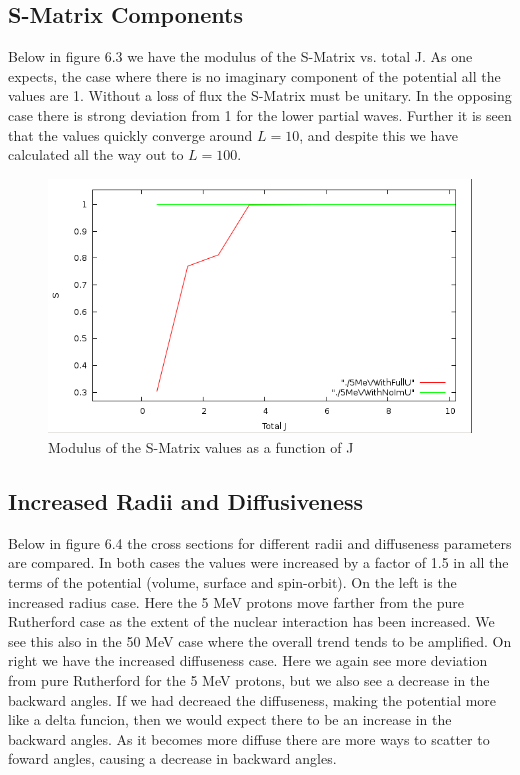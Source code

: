 \documentclass[paper=a4, fontsize=11pt]{scrartcl} %
\numberwithin{equation}{section} %
\numberwithin{figure}{section} %
\numberwithin{table}{section} %
\begin{document}
\subsection{S-Matrix Components}
Below in figure 6.3 we have the modulus of the S-Matrix vs. total J.  As one expects, the case where there is no imaginary component of the potential all the values are 1.  Without a loss of flux the S-Matrix must be unitary.  In the opposing case there is strong deviation from 1 for the lower partial waves.  Further it is seen that the values quickly converge around $L=10$, and despite this we have calculated all the way out to $L=100$.
\begin{figure}[hbt]
        \centering
	\includegraphics[width=.4\textwidth]{SMatrixV_J.PNG}
 \caption{Modulus of the S-Matrix values as a function of J}	
\end{figure}


\subsection{Increased Radii and Diffusiveness}

Below in figure 6.4 the cross sections for different radii and diffuseness parameters are compared.  In both cases the values were increased by a factor of 1.5 in all the terms of the potential (volume, surface and spin-orbit).  On the left is the increased radius case.  Here the 5 MeV protons move farther from the pure Rutherford case as the extent of the nuclear interaction has been increased.  We see this also in the 50 MeV case where the overall trend tends to be amplified.  On right we have the increased diffuseness case.  Here we again see more deviation from pure Rutherford for the 5 MeV protons, but we also see a decrease in the backward angles.  If we had decreaed the diffuseness, making the potential more like a delta funcion, then we would expect there to be an increase in the backward angles.  As it becomes more diffuse there are more ways to scatter to foward angles, causing a decrease in backward angles.
\end{document}
